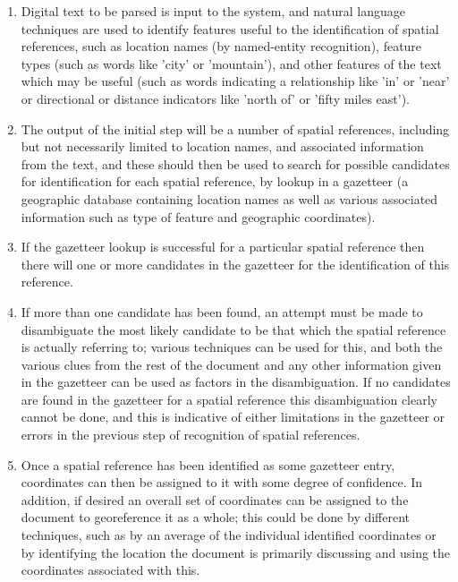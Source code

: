 \documentclass[12pt, a4paper]{report}
\begin{document}
\begin{enumerate}
	\item {Digital text to be parsed is input to the system, and natural language techniques are used to identify features useful to the identification of spatial references, such as location names (by named-entity recognition), feature types (such as words like 'city' or 'mountain'), and other features of the text which may be useful (such as words indicating a relationship like 'in' or 'near' or directional or distance indicators like 'north of' or 'fifty miles east').}
	\item {The output of the initial step will be a number of spatial references, including but not necessarily limited to location names, and associated information from the text, and these should then be used to search for possible candidates for identification for each spatial reference, by lookup in a gazetteer (a geographic database containing location names as well as various associated information such as type of feature and geographic coordinates).}
	\item {If the gazetteer lookup is successful for a particular spatial reference then there will one or more candidates in the gazetteer for the identification of this reference.}
	\item {If more than one candidate has been found, an attempt must be made to disambiguate the most likely candidate to be that which the spatial reference is actually referring to; various techniques can be used for this, and both the various clues from the rest of the document and any other information given in the gazetteer can be used as factors in the disambiguation. If no candidates are found in the gazetteer for a spatial reference this disambiguation clearly cannot be done, and this is indicative of either limitations in the gazetteer or errors in the previous step of recognition of spatial references.}
	\item {Once a spatial reference has been identified as some gazetteer entry, coordinates can then be assigned to it with some degree of confidence. In addition, if desired an overall set of coordinates can be assigned to the document to georeference it as a whole; this could be done by different techniques, such as by an average of the individual identified coordinates or by identifying the location the document is primarily discussing and using the coordinates associated with this.}

\end{enumerate}
\end{document}
